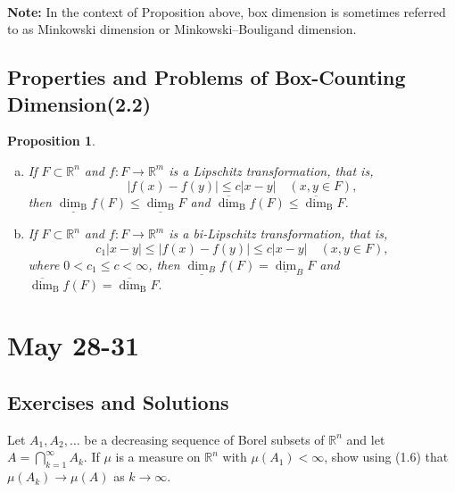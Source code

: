 \documentclass[12pt, a4paper]{article}
\newtheorem{proposition}{Proposition}[subsection]
\begin{document}
\textbf{\\Note: }In the context of Proposition above, box dimension is sometimes referred to as Minkowski dimension or Minkowski–Bouligand dimension.


\newpage
\subsection{Properties and Problems of Box-Counting Dimension(2.2)}



\begin{proposition}\label{prop2.5} $ $
    \begin{enumerate}[a.]
        \item If $F \subset \mathbb{R}^{n}$ and $f: F \rightarrow \mathbb{R}^{m}$ is a Lipschitz transformation, that is,
        $$
        |f(x)-f(y)| \leq c|x-y| \quad(x, y \in F),
        $$
        then $\underline{\operatorname{dim}_{\mathrm{B}}} f(F) \leq \underline{\operatorname{dim}_{\mathrm{B}}} F$ and $\overline{\operatorname{dim}}_{\mathrm{B}} f(F) \leq \overline{\operatorname{dim}}_{\mathrm{B}} F$.
        
        \item If $F \subset \mathbb{R}^{n}$ and $f: F \rightarrow \mathbb{R}^{m}$ is a bi-Lipschitz transformation, that is,
        $$
        c_{1}|x-y| \leq|f(x)-f(y)| \leq c|x-y| \quad(x, y \in F),
        $$
        where $0<c_{1} \leq c<\infty$, then $\underline{\operatorname{dim}_{B}} f(F)=\underline{\operatorname{dim}}_{B} F$ and
        $\overline{\operatorname{dim}}_{\mathrm{B}} f(F)=\overline{\operatorname{dim}}_{\mathrm{B}} F .$
        
    \end{enumerate}
\end{proposition}


\newpage
\section{May 28-31}
\subsection{Exercises and Solutions}

\begin{customexercise}{1.18}
    Let $A_{1}, A_{2}, \ldots$ be a decreasing sequence of Borel subsets of $\mathbb{R}^{n}$ and let $A=\bigcap_{k=1}^{\infty} A_{k} .$ If $\mu$ is a measure on $\mathbb{R}^{n}$ with $\mu\left(A_{1}\right)<\infty$, show using (1.6) that $\mu\left(A_{k}\right) \rightarrow \mu(A)$ as $k \rightarrow \infty$.
\end{customexercise}
\end{document}
